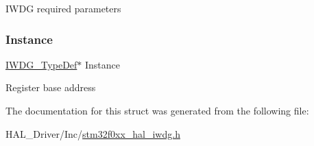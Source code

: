 I\+W\+DG required parameters \mbox{\label{struct_i_w_d_g___handle_type_def_a94413f7ca8c547a5182ec3b56c2935d2}} 
\subsubsection{\texorpdfstring{Instance}{Instance}}
{\footnotesize\ttfamily \hyperlink{struct_i_w_d_g___type_def}{I\+W\+D\+G\+\_\+\+Type\+Def}$\ast$ Instance}

Register base address 

The documentation for this struct was generated from the following file\+:\begin{DoxyCompactItemize}
\item 
H\+A\+L\+\_\+\+Driver/\+Inc/\hyperlink{stm32f0xx__hal__iwdg_8h}{stm32f0xx\+\_\+hal\+\_\+iwdg.\+h}\end{DoxyCompactItemize}
